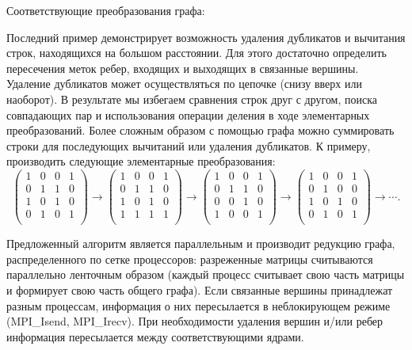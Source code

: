 \clearpage
Соответствующие преобразования графа:
\begin{figure}[h]
	\noindent{}
	\label{figCurves}
\end{figure}

Последний пример демонстрирует возможность удаления дубликатов и вычитания строк,
находящихся на большом расстоянии. Для этого достаточно определить пересечения меток ребер, входящих и выходящих в связанные вершины. Удаление дубликатов может
осуществляться по цепочке (снизу вверх или наоборот). В результате мы избегаем сравнения строк друг с другом, поиска совпадающих пар и использования операции деления
в ходе элементарных преобразований. Более сложным образом с помощью графа можно
суммировать строки для последующих вычитаний или удаления дубликатов. К примеру, производить следующие элементарные преобразования:
\[
\begin{pmatrix}
	1 & 0 & 0 & 1\\
	0 & 1 & 1 & 0\\
	1 & 0 & 1 & 0\\
	0 & 1 & 0 & 1\\
\end{pmatrix}\rightarrow
\begin{pmatrix}
	1 & 0 & 0 & 1\\
	0 & 1 & 1 & 0\\
	1 & 0 & 1 & 0\\
	1 & 1 & 1 & 1\\
\end{pmatrix}
\rightarrow
\begin{pmatrix}
	1 & 0 & 0 & 1\\
	0 & 1 & 1 & 0\\
	0 & 0 & 1 & 0\\
	1 & 0 & 0 & 1\\
\end{pmatrix}
\rightarrow
\begin{pmatrix}
	1 & 0 & 0 & 1\\
	0 & 1 & 0 & 0\\
	1 & 0 & 1 & 0\\
	0 & 1 & 0 & 1\\
\end{pmatrix}\rightarrow\cdots.
\]

Предложенный алгоритм является параллельным и производит редукцию графа, распределенного по сетке процессоров: разреженные матрицы считываются параллельно ленточным образом (каждый процесс считывает свою часть матрицы и формирует свою часть
общего графа). Если связанные вершины принадлежат разным процессам, информация о
них пересылается в неблокирующем режиме (MPI\_Isend, MPI\_Irecv). При необходимости удаления вершин и/или ребер информация пересылается между соответствующими
ядрами.

